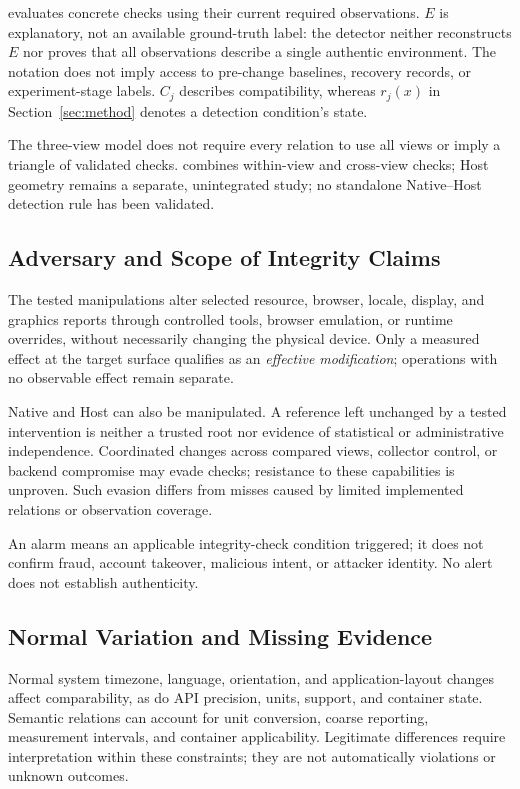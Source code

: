 \hg evaluates concrete checks using their current required observations. $E$ is explanatory, not an available ground-truth label: the detector neither reconstructs $E$ nor proves that all observations describe a single authentic environment. The notation does not imply access to pre-change baselines, recovery records, or experiment-stage labels. $C_j$ describes compatibility, whereas $r_j(x)$ in Section~\ref{sec:method} denotes a detection condition's state.

The three-view model does not require every relation to use all views or imply a triangle of validated checks. \full combines within-view and cross-view checks; Host geometry remains a separate, unintegrated study; no standalone Native--Host detection rule has been validated.

\subsection{Adversary and Scope of Integrity Claims}
The tested manipulations alter selected resource, browser, locale, display, and graphics reports through controlled tools, browser emulation, or runtime overrides, without necessarily changing the physical device. Only a measured effect at the target surface qualifies as an \emph{effective modification}; operations with no observable effect remain separate.

Native and Host can also be manipulated. A reference left unchanged by a tested intervention is neither a trusted root nor evidence of statistical or administrative independence. Coordinated changes across compared views, collector control, or backend compromise may evade checks; resistance to these capabilities is unproven. Such evasion differs from misses caused by limited implemented relations or observation coverage.

An alarm means an applicable integrity-check condition triggered; it does not confirm fraud, account takeover, malicious intent, or attacker identity. No alert does not establish authenticity.

\subsection{Normal Variation and Missing Evidence}
Normal system timezone, language, orientation, and application-layout changes affect comparability, as do API precision, units, support, and container state. Semantic relations can account for unit conversion, coarse reporting, measurement intervals, and container applicability. Legitimate differences require interpretation within these constraints; they are not automatically violations or unknown outcomes.

